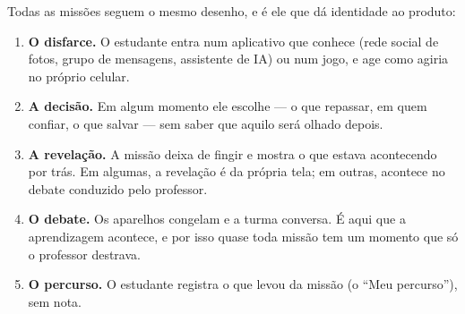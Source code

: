 Todas as missões seguem o mesmo desenho, e é ele que dá identidade ao
produto:

\begin{enumerate}
  \item \textbf{O disfarce.} O estudante entra num aplicativo que conhece
    (rede social de fotos, grupo de mensagens, assistente de IA) ou num jogo,
    e age como agiria no próprio celular.
  \item \textbf{A decisão.} Em algum momento ele escolhe --- o que repassar,
    em quem confiar, o que salvar --- sem saber que aquilo será olhado depois.
  \item \textbf{A revelação.} A missão deixa de fingir e mostra o que estava
    acontecendo por trás. Em algumas, a revelação é da própria tela; em
    outras, acontece no debate conduzido pelo professor.
  \item \textbf{O debate.} Os aparelhos congelam e a turma conversa. É aqui
    que a aprendizagem acontece, e por isso quase toda missão tem um momento
    que só o professor destrava.
  \item \textbf{O percurso.} O estudante registra o que levou da missão (o
    \enquote{Meu percurso}), sem nota.
\end{enumerate}

